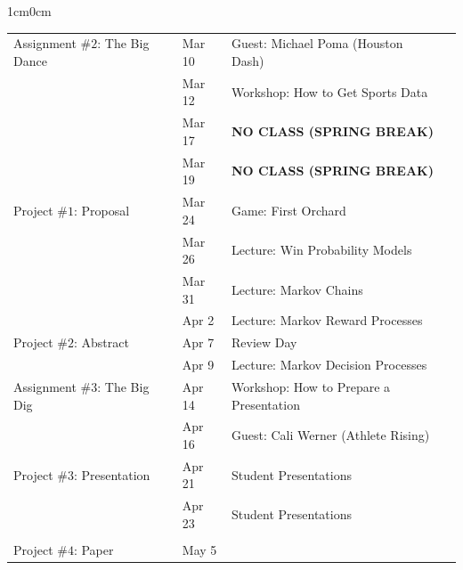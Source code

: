 \documentclass[11pt]{article}
\begin{document}
\begin{adjustwidth}{1cm}{0cm}
\begin{center}
\begin{tabular}{llll}
      \hline
      Assignment \#$2$: The Big Dance           & Mar 10  & Guest: Michael Poma (Houston Dash)\\
                                                & Mar 12  & Workshop: How to Get Sports Data\\
      \hline
                                                & Mar 17  & {\bf NO CLASS (SPRING BREAK)}\\
                                                & Mar 19  & {\bf NO CLASS (SPRING BREAK)}\\
      \hline
      \hline
      Project \#$1$: Proposal                   & Mar 24  & Game: First Orchard\\
                                                & Mar 26  & Lecture: Win Probability Models\\
      \hline
                                                & Mar 31  & Lecture: Markov Chains\\
                                                & Apr  2  & Lecture: Markov Reward Processes\\
      \hline
      Project \#$2$: Abstract                   & Apr  7  & Review Day\\
                                                & Apr  9  & Lecture: Markov Decision Processes\\
      \hline
      Assignment \#$3$: The Big Dig             & Apr 14  & Workshop: How to Prepare a Presentation\\
                                                & Apr 16  & Guest: Cali Werner (Athlete Rising)\\
      \hline
      \hline
      Project \#$3$: Presentation               & Apr 21  & Student Presentations\\
                                                & Apr 23  & Student Presentations\\
      \hline
      \\
      Project \#$4$: Paper                      & May  5  & \\
    \end{tabular}
  \end{center}
\end{adjustwidth}


\newpage

\end{document}
